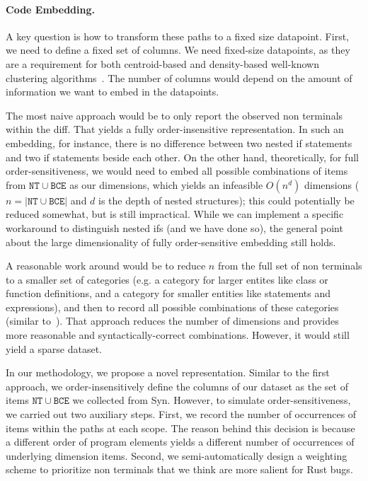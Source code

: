 \paragraph{Code Embedding.} A key question is how to transform these paths to a fixed size datapoint. First, we need to define a fixed set of columns. We need fixed-size datapoints, as they are a requirement for both centroid-based and density-based well-known clustering algorithms~\cite{xu2005survey}. The number of columns would depend on the amount of information we want to embed in the datapoints. 

The most naive approach would be to only report the observed non terminals within the diff. That yields a fully order-insensitive representation. In such an embedding, for instance, there is no difference between two nested if statements and two if statements beside each other. On the other hand, theoretically, for full order-sensitiveness, we would need to embed all possible combinations of items from $\mathtt{NT} \cup \mathtt{BCE}$ as our dimensions, which yields an infeasible $O(n^d)$ dimensions ($n=|\mathtt{NT} \cup \mathtt{BCE}|$ and $d$ is the depth of nested structures); this could potentially be reduced somewhat, but is still impractical. While we can implement a specific workaround to distinguish nested ifs (and we have done so), the general point about the large dimensionality of fully order-sensitive embedding still holds.

A reasonable work around would be to reduce $n$ from the full set of non terminals to a smaller set of categories (e.g. a category for larger entites like class or function definitions, and a category for smaller entities like statements and expressions), and then to record all possible combinations of these categories (similar to~\cite{hanam2016discovering}). That approach reduces the number of dimensions and provides more reasonable and syntactically-correct combinations. However, it would still yield a sparse dataset. 

In our methodology, we propose a novel representation. Similar to the first approach, we order-insensitively define the columns of our dataset as the set of items $\mathtt{NT} \cup \mathtt{BCE}$ we collected from Syn. However, to simulate order-sensitiveness, we carried out two auxiliary steps. First, we record the number of occurrences of items within the paths at each scope. The reason behind this decision is because a different order of program elements yields a different number of occurrences of underlying dimension items. Second, we semi-automatically design a weighting scheme to prioritize non terminals that we think are more salient for Rust bugs.

